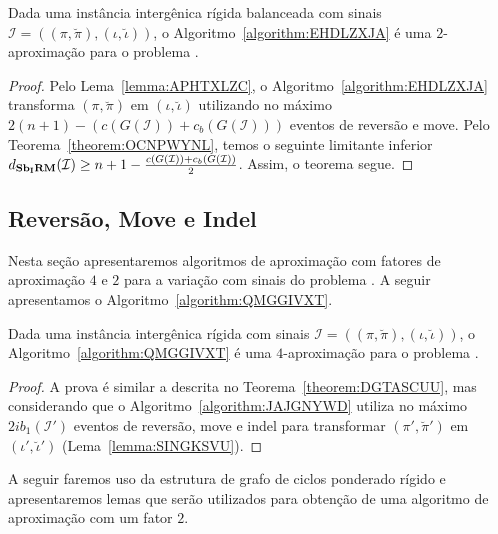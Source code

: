 \begin{theorem}\label{theorem:JYTYUTQA}
Dada uma instância intergênica rígida balanceada com sinais $\mathcal{I}=((\pi,\breve\pi),(\iota,\breve\iota))$, o Algoritmo~\ref{algorithm:EHDLZXJA} é uma $2$-aproximação para o problema \SbIRM{}.
\end{theorem}
\begin{proof}
Pelo Lema~\ref{lemma:APHTXLZC}, o Algoritmo~\ref{algorithm:EHDLZXJA} transforma $(\pi,\breve\pi)$ em $(\iota,\breve\iota)$ utilizando no máximo $2(n + 1) - (c(G(\mathcal{I})) + c_b(G(\mathcal{I})))$ eventos de reversão e move. Pelo Teorema~\ref{theorem:OCNPWYNL}, temos o seguinte limitante inferior $d_{\textbf{Sb\textsubscript{I}RM}}(\mathcal{I}) \ge {n + 1} - \frac{c(G(\mathcal{I})) + c_b(G(\mathcal{I}))}{2}$. Assim, o teorema segue.
\end{proof}

\subsection{Reversão, Move e Indel}

Nesta seção apresentaremos algoritmos de aproximação com fatores de aproximação $4$ e $2$ para a variação com sinais do problema \SbIRMI{}. A seguir apresentamos o Algoritmo~\ref{algorithm:QMGGIVXT}.



\begin{theorem}\label{theorem:PZXMHZFE}
Dada uma instância intergênica rígida com sinais $\mathcal{I}=((\pi,\breve\pi),(\iota,\breve\iota))$, o Algoritmo~\ref{algorithm:QMGGIVXT} é uma $4$-aproximação para o problema \SbIRMI{}.
\end{theorem}
\begin{proof}
A prova é similar a descrita no Teorema~\ref{theorem:DGTASCUU}, mas considerando que o Algoritmo~\ref{algorithm:JAJGNYWD} utiliza no máximo $2ib_1(\mathcal{I'})$ eventos de reversão, move e indel para transformar $(\pi',\breve\pi')$ em $(\iota',\breve\iota')$ (Lema~\ref{lemma:SINGKSVU}).
\end{proof}

A seguir faremos uso da estrutura de grafo de ciclos ponderado rígido e apresentaremos lemas que serão utilizados para obtenção de uma algoritmo de aproximação com um fator $2$.

